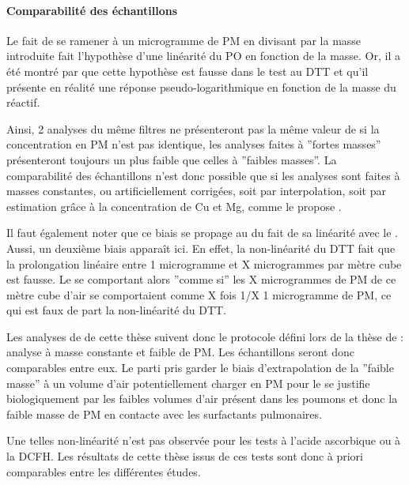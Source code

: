 \paragraph{Comparabilité des échantillons}%
\label{par:comparabilité_des_échantillons}

Le fait de se ramener à un microgramme de PM en divisant par la masse introduite fait
l'hypothèse d'une linéarité du PO en fonction de la masse. Or, il a été montré par
\textcite{charrierDithiothreitol2012,charrierBias2016,calasComparison2018} que cette
hypothèse est fausse dans le test au DTT et qu'il présente en réalité une réponse
pseudo-logarithmique en fonction de la masse du réactif.

Ainsi, 2 analyses du même filtres ne présenteront pas la même valeur de \PODTTm{} si la
concentration en PM n'est pas identique, les analyses faites à ''fortes masses''
présenteront toujours un \PODTTm{} plus faible que celles à ''faibles masses''.
La comparabilité des échantillons n'est donc possible que si les analyses sont faites à
masses constantes, ou artificiellement corrigées, soit par interpolation, soit par
estimation grâce à la concentration de Cu et Mg, comme le propose
\textcite{charrierBias2016}.

Il faut également noter que ce biais se propage au \PODTTv{} du fait de sa linéarité avec le
\PODTTm. Aussi, un deuxième biais apparaît ici. En effet, la non-linéarité du DTT fait
que la prolongation linéaire entre 1 microgramme et X microgrammes par mètre cube est
fausse. Le \PODTTv{} se comportant alors ''comme si'' les X microgrammes de PM de ce mètre
cube d'air se comportaient comme X fois 1/X 1 microgramme de PM, ce qui est faux de part
la non-linéarité du DTT.

Les analyses de \PODTT{} de cette thèse suivent donc le protocole défini lors de la thèse
de \textcite{calasPollution2017} : analyse à masse constante et faible de PM. Les
échantillons seront donc comparables entre eux. Le parti pris garder le biais
d'extrapolation de la ''faible masse'' à un volume d'air potentiellement charger en PM
pour le \PODTTv{} se justifie biologiquement par les faibles volumes d'air présent dans les
poumons et donc la faible masse de PM en contacte avec les surfactants pulmonaires.

Une telles non-linéarité n'est pas observée pour les tests à l'acide ascorbique ou à la
DCFH.
Les résultats de cette thèse issus de ces tests sont donc à priori comparables entre les
différentes études.


